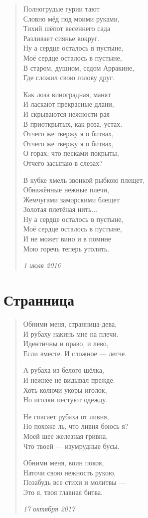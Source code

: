 \begin{verse}
Полногрудые гурии тают\\
Словно мёд под моими руками,\\
Тихий шёпот весеннего сада\\
Разливает сиянье вокруг.\\
Ну а сердце осталось в пустыне,\\
Моё сердце осталось в пустыне,\\
В старом, душном, седом Арракине,\\
Где сложил свою голову друг.

Как лоза виноградная, манят\\
И ласкают прекрасные длани,\\
И скрываются нежности рая\\
В приоткрытых, как роза, устах.\\
Отчего же твержу я о битвах,\\
Отчего же твержу я о битвах,\\
О горах, что песками покрыты,\\
Отчего засыпаю в слезах?

В кубке хмель звонкой рыбкою плещет,\\
Обнажённые нежные плечи,\\
Жемчугами заморскими блещет\\
Золотая плетёная нить...\\
Ну а сердце осталось в пустыне,\\
Моё сердце осталось в пустыне,\\
И не может вино и в помине\\
Мою горечь теперь утолить.

\emph{1 июля 2016}
\end{verse}
\newpage

\section{Странница}

\begin{verse}
 Обними меня, странница-дева,\\
И рубаху накинь мне на плечи.\\
Идентичны и право, и лево,\\
Если вместе. И сложное --- легче.

А рубаха из белого шёлка,\\
И нежнее не видывал прежде.\\
Хоть колючи укоры иголок,\\
Но иголки пестуют одежду.

Не спасает рубаха от ливня,\\
Но похоже ль, что ливня боюсь я?\\
Моей шее железная гривна,\\
Что твоей --- изумрудные бусы.

Обними меня, воин покоя,\\
Наточи свою нежность рукою,\\
Позабудь все стихи и молитвы ---\\
Это я, твоя главная битва.

\emph{17 октября 2017}
\end{verse}
\newpage

